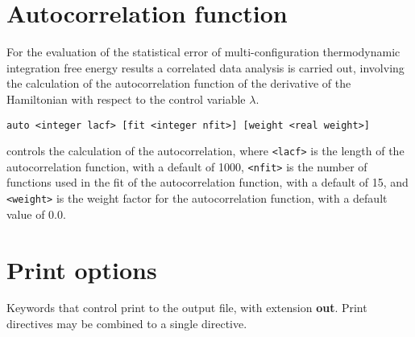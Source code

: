 \section{Autocorrelation function}
For the evaluation of the statistical error of multi-configuration
thermodynamic integration free energy results a correlated data 
analysis is carried out, involving the calculation of the
autocorrelation function of the derivative of the Hamiltonian with
respect to the control variable $\lambda$.
\begin{description}

\item 
\begin{verbatim}
auto <integer lacf> [fit <integer nfit>] [weight <real weight>]
\end{verbatim}
controls the calculation of the autocorrelation,
where \verb+<lacf>+ is the length of the autocorrelation function, with
a default of 1000, \verb+<nfit>+ is the number of functions used in the
fit of the autocorrelation function, with a default of 15, and
\verb+<weight>+ is the weight factor for the autocorrelation function,
with a default value of 0.0.
\end{description}

\section{Print options}
Keywords that control print to the output file, with extension {\bf out}.
Print directives may be combined to a single directive.

